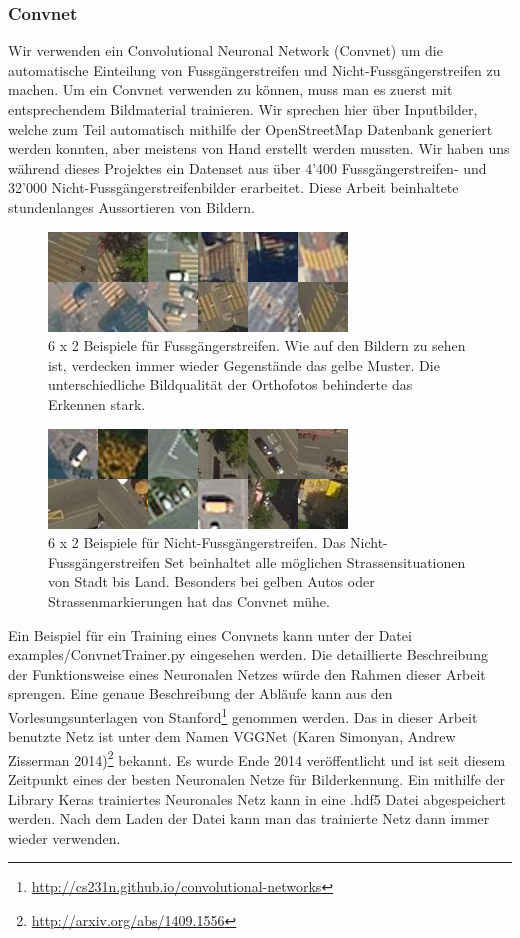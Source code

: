 \subsubsection{Convnet}
Wir verwenden ein Convolutional Neuronal Network (Convnet) um die automatische Einteilung von Fussgängerstreifen und Nicht-Fussgängerstreifen zu machen. Um ein Convnet verwenden zu können, muss man es zuerst mit entsprechendem Bildmaterial trainieren. Wir sprechen hier über Inputbilder, welche zum Teil automatisch mithilfe der OpenStreetMap Datenbank generiert werden konnten, aber meistens von Hand erstellt werden mussten. Wir haben uns während dieses Projektes ein Datenset aus über 4'400 Fussgängerstreifen- und 32'000 Nicht-Fussgängerstreifenbilder erarbeitet. Diese Arbeit beinhaltete stundenlanges Aussortieren von Bildern.
\\

\begin{figure}[H]
	\centering
	\includegraphics{images/Zebrastreifen_examples.png}
	\caption[Beispiele für Fussgängerstreifen]{6 x 2 Beispiele für Fussgängerstreifen. Wie auf den Bildern zu sehen ist, verdecken immer wieder Gegenstände das gelbe Muster. Die unterschiedliche Bildqualität der Orthofotos behinderte das Erkennen stark.}
\end{figure}

\begin{figure}[H]
	\centering
	\includegraphics{images/No_Zebrastreifen_examples.png}
	\caption[Beispiele für Nicht-Fussgängerstreifen]{6 x 2 Beispiele für Nicht-Fussgängerstreifen. Das Nicht-Fussgängerstreifen Set beinhaltet alle möglichen Strassensituationen von Stadt bis Land. Besonders bei gelben Autos oder Strassenmarkierungen hat das Convnet mühe.}
\end{figure}

Ein Beispiel für ein Training eines Convnets kann unter der Datei examples/ConvnetTrainer.py eingesehen werden. Die detaillierte Beschreibung der Funktionsweise eines Neuronalen Netzes würde den Rahmen dieser Arbeit sprengen. Eine genaue Beschreibung der Abläufe kann aus den Vorlesungsunterlagen von Stanford\footnote{\url{http://cs231n.github.io/convolutional-networks}} genommen werden. Das in dieser Arbeit benutzte Netz ist unter dem Namen VGGNet (Karen Simonyan, Andrew Zisserman 2014)\footnote{\url{http://arxiv.org/abs/1409.1556}} bekannt. Es wurde Ende 2014 veröffentlicht und ist seit diesem Zeitpunkt eines der besten Neuronalen Netze für Bilderkennung. Ein mithilfe der Library Keras trainiertes Neuronales Netz kann in eine .hdf5 Datei abgespeichert werden. Nach dem Laden der Datei kann man das trainierte Netz dann immer wieder verwenden.

